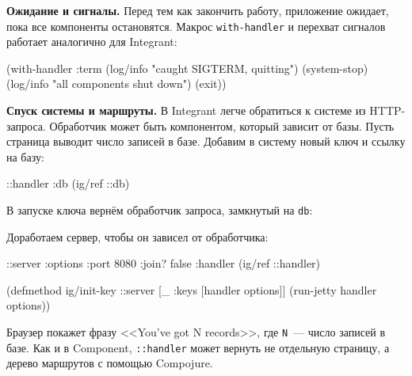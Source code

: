 
\textbf{Ожидание и сигналы.} Перед тем как закончить работу, приложение ожидает,
пока все компоненты остановятся. Макрос \verb|with-handler| и перехват
сигналов работает аналогично для Integrant:

\begin{english}
  \begin{clojure}
(with-handler :term
  (log/info "caught SIGTERM, quitting")
  (system-stop)
  (log/info "all components shut down")
  (exit))
  \end{clojure}
\end{english}


\textbf{Спуск системы и маршруты.} В Integrant легче обратиться к системе из
HTTP-запроса. Обработчик может быть компонентом, который зависит от базы. Пусть
страница выводит число записей в базе. Добавим в систему новый ключ и ссылку на
базу:

\begin{english}
  \begin{clojure}
{::handler {:db (ig/ref ::db)}}
  \end{clojure}
\end{english}

\noindent
В запуске ключа вернём обработчик запроса, замкнутый на \verb|db|:

\begin{english}
\end{english}

\noindent
Доработаем сервер, чтобы он зависел от обработчика:

\begin{english}
  \begin{clojure}
{::server {:options {:port 8080 :join? false}
           :handler (ig/ref ::handler)}}

(defmethod ig/init-key ::server
  [_ {:keys [handler options]}]
  (run-jetty handler options))
  \end{clojure}
\end{english}

Браузер покажет фразу <<You've got N records>>, где \verb|N|~--- число записей
в базе. Как и в Component, \verb|::handler| может вернуть не отдельную
страницу, а дерево маршрутов с помощью Compojure.

